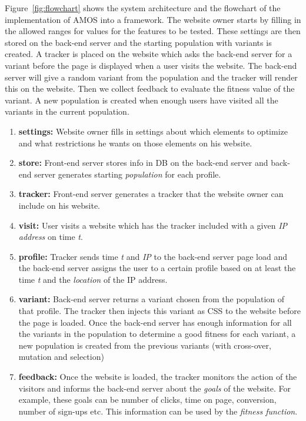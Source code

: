 \documentclass{report}
\begin{document}
Figure~\ref{fig:flowchart} shows the system architecture and the flowchart of the implementation of AMOS into a framework. The website owner starts by filling in the allowed ranges for values for the features to be tested. These settings are then stored on the back-end server and the starting population with variants is created. A tracker is placed on the website which asks the back-end server for a variant before the page is displayed when a user visits the website. The back-end server will give a random variant from the population and the tracker will render this on the website. Then we collect feedback to evaluate the fitness value of the variant. A new population is created when enough users have visited all the variants in the current population.
\begin{enumerate}
	\item \textbf{settings:} Website owner fills in settings about which elements to optimize and what restrictions he wants on those elements on his website.
	\item \textbf{store:} Front-end server stores info in DB on the back-end server and back-end server generates starting \emph{population} for each profile.
	\item \textbf{tracker:} Front-end server generates a tracker that the website owner can include on his website.
	\item \textbf{visit:} User visits a website which has the tracker included with a given \emph{IP address} on time \emph{t}.
	\item \textbf{profile:} Tracker sends time \emph{t} and \emph{IP} to the back-end server page load and the back-end server assigns the user to a certain profile based on at least the time \emph{t} and the \emph{location} of the IP address.
	\item \textbf{variant:} Back-end server returns a variant chosen from the population of that profile. The tracker then injects this variant as CSS to the website before the page is loaded. Once the back-end server has enough information for all the variants in the population to determine a good fitness for each variant, a new population is created from the previous variants (with cross-over, mutation and selection)
	\item \textbf{feedback:} Once the website is loaded, the tracker monitors the action of the visitors and informs the back-end server about the \emph{goals} of the website. For example, these goals can be number of clicks, time on page, conversion, number of sign-ups etc. This information can be used by the \emph{fitness function}. 
\end{enumerate}
\end{document}
